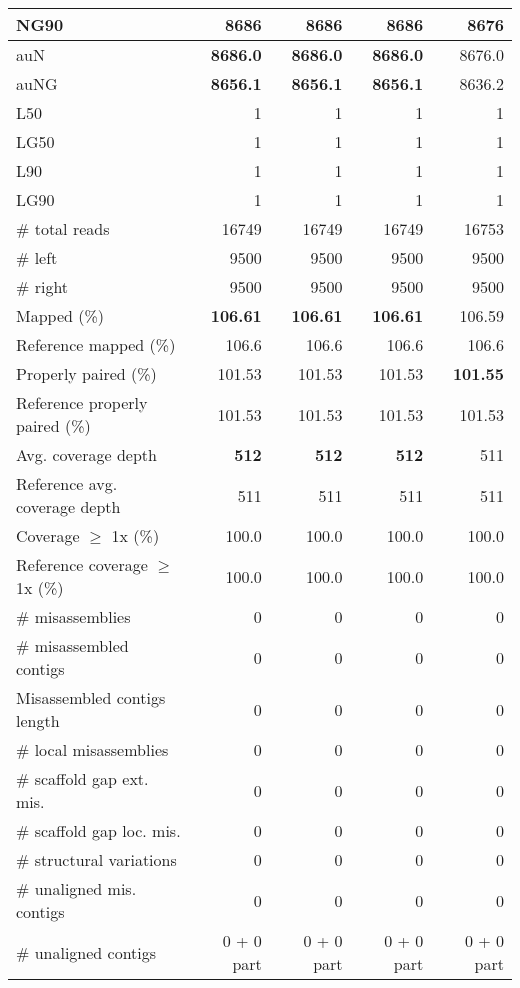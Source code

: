 \documentclass[12pt,a4paper]{article}
\begin{document}
\begin{table}[ht]
\begin{center}
\begin{tabular}{|l*{4}{|r}|}
NG90 & {\bf 8686} & {\bf 8686} & {\bf 8686} & 8676 \\ \hline
auN & {\bf 8686.0} & {\bf 8686.0} & {\bf 8686.0} & 8676.0 \\ \hline
auNG & {\bf 8656.1} & {\bf 8656.1} & {\bf 8656.1} & 8636.2 \\ \hline
L50 & 1 & 1 & 1 & 1 \\ \hline
LG50 & 1 & 1 & 1 & 1 \\ \hline
L90 & 1 & 1 & 1 & 1 \\ \hline
LG90 & 1 & 1 & 1 & 1 \\ \hline
\# total reads & 16749 & 16749 & 16749 & 16753 \\ \hline
\# left & 9500 & 9500 & 9500 & 9500 \\ \hline
\# right & 9500 & 9500 & 9500 & 9500 \\ \hline
Mapped (\%) & {\bf 106.61} & {\bf 106.61} & {\bf 106.61} & 106.59 \\ \hline
Reference mapped (\%) & 106.6 & 106.6 & 106.6 & 106.6 \\ \hline
Properly paired (\%) & 101.53 & 101.53 & 101.53 & {\bf 101.55} \\ \hline
Reference properly paired (\%) & 101.53 & 101.53 & 101.53 & 101.53 \\ \hline
Avg. coverage depth & {\bf 512} & {\bf 512} & {\bf 512} & 511 \\ \hline
Reference avg. coverage depth & 511 & 511 & 511 & 511 \\ \hline
Coverage $\geq$ 1x (\%) & 100.0 & 100.0 & 100.0 & 100.0 \\ \hline
Reference coverage $\geq$ 1x (\%) & 100.0 & 100.0 & 100.0 & 100.0 \\ \hline
\# misassemblies & 0 & 0 & 0 & 0 \\ \hline
\# misassembled contigs & 0 & 0 & 0 & 0 \\ \hline
Misassembled contigs length & 0 & 0 & 0 & 0 \\ \hline
\# local misassemblies & 0 & 0 & 0 & 0 \\ \hline
\# scaffold gap ext. mis. & 0 & 0 & 0 & 0 \\ \hline
\# scaffold gap loc. mis. & 0 & 0 & 0 & 0 \\ \hline
\# structural variations & 0 & 0 & 0 & 0 \\ \hline
\# unaligned mis. contigs & 0 & 0 & 0 & 0 \\ \hline
\# unaligned contigs & 0 + 0 part & 0 + 0 part & 0 + 0 part & 0 + 0 part \\ \hline

\end{tabular}
\end{center}
\end{table}
\end{document}
